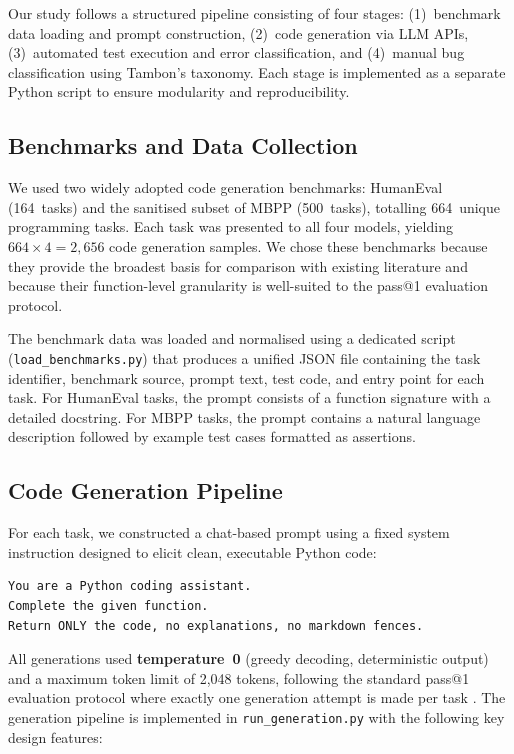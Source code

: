 \documentclass[smallextended]{svjour3}
\begin{document}
Our study follows a structured pipeline consisting of four stages: (1)~benchmark data loading and prompt construction, (2)~code generation via LLM APIs, (3)~automated test execution and error classification, and (4)~manual bug classification using Tambon's taxonomy. Each stage is implemented as a separate Python script to ensure modularity and reproducibility.

\subsection{Benchmarks and Data Collection}
\label{sec:benchmarks}

We used two widely adopted code generation benchmarks: HumanEval \citep{chen2021evaluating} (164~tasks) and the sanitised subset of MBPP \citep{austin2021program} (500~tasks), totalling 664~unique programming tasks. Each task was presented to all four models, yielding $664 \times 4 = 2{,}656$ code generation samples. We chose these benchmarks because they provide the broadest basis for comparison with existing literature and because their function-level granularity is well-suited to the pass@1 evaluation protocol.

The benchmark data was loaded and normalised using a dedicated script (\texttt{load\_benchmarks.py}) that produces a unified JSON file containing the task identifier, benchmark source, prompt text, test code, and entry point for each task. For HumanEval tasks, the prompt consists of a function signature with a detailed docstring. For MBPP tasks, the prompt contains a natural language description followed by example test cases formatted as assertions.

\subsection{Code Generation Pipeline}
\label{sec:generation}

For each task, we constructed a chat-based prompt using a fixed system instruction designed to elicit clean, executable Python code:

\begin{lstlisting}[caption={System prompt used for all code generation requests across all four models.},label=lst:sysprompt,language={}]
You are a Python coding assistant.
Complete the given function.
Return ONLY the code, no explanations, no markdown fences.
\end{lstlisting}

All generations used \textbf{temperature~0} (greedy decoding, deterministic output) and a maximum token limit of 2,048 tokens, following the standard pass@1 evaluation protocol where exactly one generation attempt is made per task \citep{chen2021evaluating}. The generation pipeline is implemented in \texttt{run\_generation.py} with the following key design features:
\end{document}
